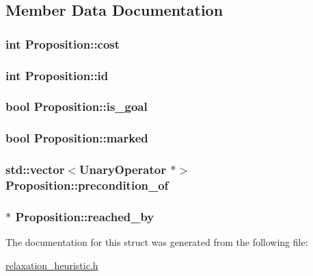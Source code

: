 \subsection{Member Data Documentation}
\hypertarget{structProposition_a3645b63c6e394bb456181bacab80152d}{
\subsubsection[{cost}]{\setlength{\rightskip}{0pt plus 5cm}int Proposition\-::cost}}\label{structProposition_a3645b63c6e394bb456181bacab80152d}
\hypertarget{structProposition_a14f502f462f92578d6d6670c2a672e87}{
\subsubsection[{id}]{\setlength{\rightskip}{0pt plus 5cm}int Proposition\-::id}}\label{structProposition_a14f502f462f92578d6d6670c2a672e87}
\hypertarget{structProposition_a35dfad2c1d63346e096f422a02974243}{
\subsubsection[{is\-\_\-goal}]{\setlength{\rightskip}{0pt plus 5cm}bool Proposition\-::is\-\_\-goal}}\label{structProposition_a35dfad2c1d63346e096f422a02974243}
\hypertarget{structProposition_a9f8cfee69ec00772a17bc9ce40b51707}{
\subsubsection[{marked}]{\setlength{\rightskip}{0pt plus 5cm}bool Proposition\-::marked}}\label{structProposition_a9f8cfee69ec00772a17bc9ce40b51707}
\hypertarget{structProposition_aaee1e7ac2c708cc09f06773766746873}{
\subsubsection[{precondition\-\_\-of}]{\setlength{\rightskip}{0pt plus 5cm}std\-::vector$<${\bf Unary\-Operator} $\ast$$>$ Proposition\-::precondition\-\_\-of}}\label{structProposition_aaee1e7ac2c708cc09f06773766746873}
\hypertarget{structProposition_a8e4ab6a08578e2ba5b4d21632fde7378}{
\subsubsection[{reached\-\_\-by}]{$\ast$ Proposition\-::reached\-\_\-by}}\label{structProposition_a8e4ab6a08578e2ba5b4d21632fde7378}


The documentation for this struct was generated from the following file\-:\begin{DoxyCompactItemize}
\item 
\hyperlink{relaxation__heuristic_8h}{relaxation\-\_\-heuristic.\-h}\end{DoxyCompactItemize}
